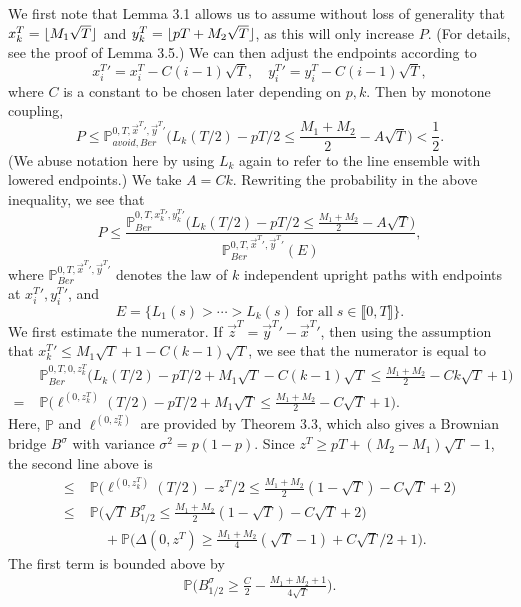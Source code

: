 \documentclass[12pt]{article}
\DeclarePairedDelimiter\floor{\lfloor}{\rfloor}
\begin{document}
	We first note that Lemma 3.1 allows us to assume without loss of generality that $x_k^T = \floor{M_1\sqrt{T}}$ and $y_k^T = \floor{pT + M_2\sqrt{T}}$, as this will only increase $P$. (For details, see the proof of Lemma 3.5.) We can then adjust the endpoints according to
	\[
	x_i^T{}' = x_i^T - C(i-1)\sqrt{T}, \quad y_i^T{}' = y_i^T - C(i-1)\sqrt{T},
	\]
	where $C$ is a constant to be chosen later depending on $p,k$. Then by monotone coupling,
	\[
	P \leq \mathbb{P}^{0,T,\vec{x}^T{}',\vec{y}^T{}'}_{avoid, Ber} \Big( L_k(T/2) - pT/2 \leq \frac{M_1+M_2}{2} - A\sqrt{T} \Big) < \frac{1}{2}.
	\]
	(We abuse notation here by using $L_k$ again to refer to the line ensemble with lowered endpoints.) We take $A = Ck$. Rewriting the probability in the above inequality, we see that
	\[
	P \leq \frac{\mathbb{P}^{0,T,x_k^T{}',y_k^T{}'}_{Ber} \Big( L_k(T/2) - pT/2 \leq \frac{M_1+M_2}{2} - A\sqrt{T} \Big)}{\mathbb{P}^{0,T,\vec{x}^T{}',\vec{y}^T{}'}_{Ber}(E)},
	\]
	where $\mathbb{P}^{0,T,\vec{x}^T{}',\vec{y}^T{}'}_{Ber}$ denotes the law of $k$ independent upright paths with endpoints at $x_i^T{}', y_i^T{}'$, and
	\[
	E = \{L_1(s) > \cdots > L_k(s)\;\textrm{for all}\;s \in \llbracket 0, T\rrbracket \}.
	\]
	We first estimate the numerator. If $\vec{z}^T = \vec{y}^T{}' - \vec{x}^T{}'$, then using the assumption that $x_k^T{}' \leq M_1\sqrt{T} + 1 - C(k-1)\sqrt{T}$, we see that the numerator is equal to
	\begin{align*}
	&\mathbb{P}^{0,T,0,z_k^T}_{Ber} \Big( L_k(T/2) - pT/2 + M_1\sqrt{T} - C(k-1)\sqrt{T} \leq \frac{M_1+M_2}{2} - Ck\sqrt{T} + 1\Big) \\
	= \; & \mathbb{P} \Big( \ell^{(0,z^T_k)}(T/2) - pT/2 + M_1\sqrt{T} \leq \frac{M_1+M_2}{2} - C\sqrt{T} + 1\Big).
	\end{align*}
	Here, $\mathbb{P}$ and $\ell^{(0,z_k^T)}$ are provided by Theorem 3.3, which also gives a Brownian bridge $B^{\sigma}$ with variance $\sigma^2 = p(1-p)$. Since $z^T \geq pT + (M_2 - M_1)\sqrt{T} - 1$, the second line above is
	\begin{align*}
	\leq \; & \mathbb{P} \Big( \ell^{(0,z^T_k)}(T/2) - z^T/2 \leq \frac{M_1+M_2}{2}(1-\sqrt{T}) - C\sqrt{T} + 2\Big)\\
	\leq \; & \mathbb{P} \Big( \sqrt{T}\,B^{\sigma}_{1/2} \leq \frac{M_1+M_2}{2}(1-\sqrt{T}) - C\sqrt{T} + 2\Big)\\
	&\quad + \mathbb{P}\Big(\Delta(0,z^T) \geq \frac{M_1+M_2}{4}(\sqrt{T}-1) + C\sqrt{T}/2 + 1\Big).
	\end{align*}
	The first term is bounded above by
	\begin{align*}
	\mathbb{P} \Big( B^{\sigma}_{1/2} \geq  \frac{C}{2} - \frac{M_1 + M_2 + 1}{4\sqrt{T}}\Big).
	\end{align*}
\end{document}
